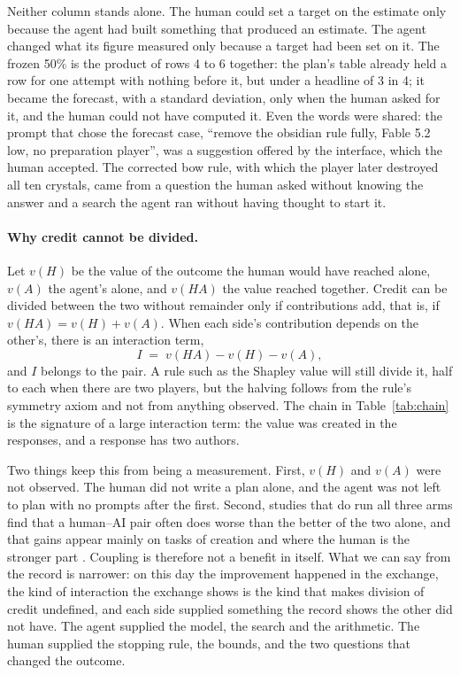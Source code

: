 \documentclass[11pt,a4paper]{article}
\begin{document}
Neither column stands alone. The human could set a target on the estimate only because the agent had built something that produced an estimate. The agent changed what its figure measured only because a target had been set on it. The frozen 50\% is the product of rows 4 to 6 together: the plan's table already held a row for one attempt with nothing before it, but under a headline of 3 in 4; it became the forecast, with a standard deviation, only when the human asked for it, and the human could not have computed it. Even the words were shared: the prompt that chose the forecast case, ``remove the obsidian rule fully, Fable 5.2 low, no preparation player'', was a suggestion offered by the interface, which the human accepted. The corrected bow rule, with which the player later destroyed all ten crystals, came from a question the human asked without knowing the answer and a search the agent ran without having thought to start it.

\paragraph{Why credit cannot be divided.} Let $v(H)$ be the value of the outcome the human would have reached alone, $v(A)$ the agent's alone, and $v(HA)$ the value reached together. Credit can be divided between the two without remainder only if contributions add, that is, if $v(HA) = v(H) + v(A)$. When each side's contribution depends on the other's, there is an interaction term,
\[
I \;=\; v(HA) - v(H) - v(A),
\]
and $I$ belongs to the pair. A rule such as the Shapley value \citep{shapley1953} will still divide it, half to each when there are two players, but the halving follows from the rule's symmetry axiom and not from anything observed. The chain in Table~\ref{tab:chain} is the signature of a large interaction term: the value was created in the responses, and a response has two authors.

Two things keep this from being a measurement. First, $v(H)$ and $v(A)$ were not observed. The human did not write a plan alone, and the agent was not left to plan with no prompts after the first. Second, studies that do run all three arms find that a human--AI pair often does worse than the better of the two alone, and that gains appear mainly on tasks of creation and where the human is the stronger part \citep{vaccaro2024}. Coupling is therefore not a benefit in itself. What we can say from the record is narrower: on this day the improvement happened in the exchange, the kind of interaction the exchange shows is the kind that makes division of credit undefined, and each side supplied something the record shows the other did not have. The agent supplied the model, the search and the arithmetic. The human supplied the stopping rule, the bounds, and the two questions that changed the outcome.
\end{document}

